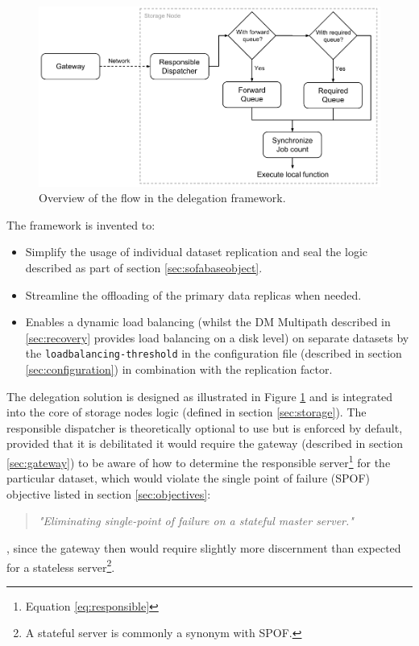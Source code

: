 \begin{figure}[ht!]
	\centering
	\includegraphics[scale=0.72]{pdf/delegation-framework.pdf}
	\caption[Overview of the delegation framework]{Overview of the flow in the delegation framework. \label{fig:delegation-framework}}
\end{figure}	

\noindent
The framework is invented to:
\begin{itemize}
	\item Simplify the usage of individual dataset replication and seal the logic described as part of section \ref{sec:sofabaseobject}.
	\item Streamline the offloading of the primary data replicas when needed.
	\item Enables a dynamic load balancing (whilst the DM Multipath described in \ref{sec:recovery} provides load balancing on a disk level) on separate datasets by the \texttt{load\-balancing-threshold} in the configuration file (described in section \ref{sec:configuration}) in combination with the replication factor.
\end{itemize}
\vspace*{4mm}
The delegation solution is designed as illustrated in Figure \ref{fig:delegation-framework} and is integrated into the core of storage nodes logic (defined in section \ref{sec:storage}). The responsible dispatcher is theoretically optional to use but is enforced by default, provided that it is debilitated it would require the gateway (described in section \ref{sec:gateway}) to be aware of how to determine the responsible server\footnote{Equation \ref{eq:responsible}} for the particular dataset, which would violate the single point of failure (SPOF) objective listed in section \ref{sec:objectives}:
\begin{quotation}
\textit{"Eliminating single-point of failure on a stateful master server."}
\end{quotation}
, since the gateway then would require slightly more discernment than expected for a stateless server\footnote{\label{note:stateful}A stateful server is commonly a synonym with SPOF.}.
\newline

